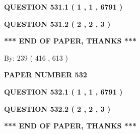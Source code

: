 \documentclass[12pt]{article}
\begin{document}
\vspace{0.2in}
  
{\textbf{\Large{QUESTION
531.1 
 ( 1 , 1 , 6791 )
}}}
  
  
  
\vspace{0.2in}
  
{\textbf{\Large{QUESTION
531.2 
 ( 2 , 2 , 3 )
}}}
  
  
   
   
 \vspace{0.2in}
 
   
   
   
   
\vspace{1.0in} 
{\textbf{\large{ *** END OF PAPER, THANKS *** }}} 
   
   
\hspace{1.0in} By: 
 239 ( 416 ,  613 )
   
   
   
   
\newpage 
\setcounter{page}{ 
   532001 } 
   
   
   
   
 {\textbf{ \Large{ PAPER NUMBER  532  }}}
   
   
\vspace{0.2in}
   
   
   
   
   
   
 \vspace{0.2in}
 
 
 
 
   
   
  
\vspace{0.2in}
  
{\textbf{\Large{QUESTION
532.1 
 ( 1 , 1 , 6791 )
}}}
  
  
  
\vspace{0.2in}
  
{\textbf{\Large{QUESTION
532.2 
 ( 2 , 2 , 3 )
}}}
  
  
   
   
 \vspace{0.2in}
 
   
   
   
   
\vspace{1.0in} 
{\textbf{\large{ *** END OF PAPER, THANKS *** }}} 
   
\end{document}
